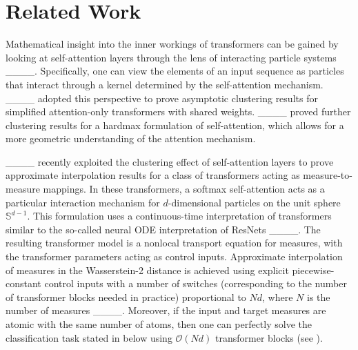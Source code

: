 \section{Related Work}
Mathematical insight into the inner workings of transformers can be gained by looking at self-attention layers through the lens of interacting particle systems ____. Specifically, one can view the elements of an input sequence as particles that interact through a kernel determined by the self-attention mechanism. ____ adopted this perspective to prove asymptotic clustering results for simplified attention-only transformers with shared weights. ____ proved further clustering results for a hardmax formulation of self-attention, which allows for a more geometric understanding of the attention mechanism.

____ recently exploited the clustering effect of self-attention layers to prove approximate interpolation results for a class of transformers acting as measure-to-measure mappings. In these transformers, a softmax self-attention acts as a particular interaction mechanism for $d$-dimensional particles on the unit sphere $\mathbb{S}^{d-1}$. This formulation uses a continuous-time interpretation of transformers similar to the so-called neural ODE interpretation of ResNets ____. The resulting transformer model is a nonlocal transport equation for measures, with the transformer parameters acting as control inputs. Approximate interpolation of measures in the Wasserstein-2 distance is achieved using explicit piecewise-constant control inputs with a number of switches (corresponding to the number of transformer blocks needed in practice) proportional to $Nd$, where $N$ is the number of measures ____. Moreover, if the input and target measures are atomic with the same number of atoms, then one can perfectly solve the classification task stated in  below using $\mathcal{O}(Nd)$ transformer blocks (see \cite[\S1.4.2]{geshkovski2024measure}).
%
